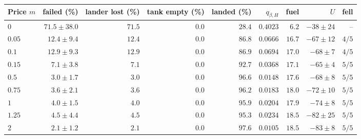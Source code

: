 \begin{tabular}{lrrrrrrrr}
\toprule
Price $m$ & failed (\%) & lander lost (\%) & tank empty (\%) & landed (\%) & $q_{\beta,H}$ & fuel & $U$ & fell \\
\midrule
$0$ & $71.5\pm38.0$ & $71.5$ & $0.0$ & $28.4$ & $0.4023$ & $6.2$ & $-38\pm24$ & -- \\
$0.05$ & $12.4\pm9.4$ & $12.4$ & $0.0$ & $86.8$ & $0.0666$ & $16.7$ & $-67\pm12$ & $4/5$ \\
$0.1$ & $12.9\pm9.3$ & $12.9$ & $0.0$ & $86.9$ & $0.0694$ & $17.0$ & $-68\pm7$ & $4/5$ \\
$0.15$ & $7.1\pm3.8$ & $7.1$ & $0.0$ & $92.7$ & $0.0368$ & $17.1$ & $-65\pm4$ & $5/5$ \\
$0.5$ & $3.0\pm1.7$ & $3.0$ & $0.0$ & $96.6$ & $0.0148$ & $17.6$ & $-68\pm8$ & $5/5$ \\
$0.75$ & $3.6\pm2.1$ & $3.6$ & $0.0$ & $96.2$ & $0.0183$ & $18.0$ & $-72\pm10$ & $5/5$ \\
$1$ & $4.0\pm1.5$ & $4.0$ & $0.0$ & $95.9$ & $0.0204$ & $17.9$ & $-74\pm8$ & $5/5$ \\
$1.25$ & $4.5\pm4.4$ & $4.5$ & $0.0$ & $95.3$ & $0.0234$ & $18.5$ & $-82\pm25$ & $5/5$ \\
$2$ & $2.1\pm1.2$ & $2.1$ & $0.0$ & $97.6$ & $0.0105$ & $18.5$ & $-83\pm8$ & $5/5$ \\
\bottomrule
\end{tabular}
